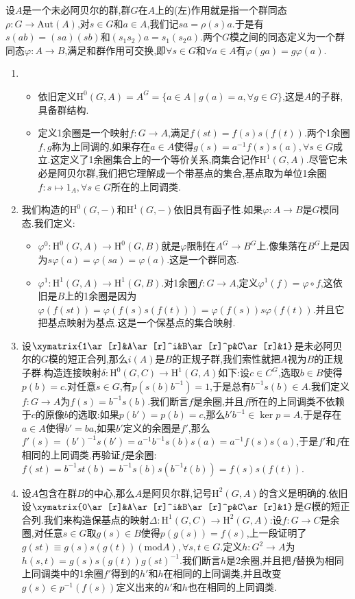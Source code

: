 设$A$是一个未必阿贝尔的群,群$G$在$A$上的(左)作用就是指一个群同态$\rho:G\to\mathrm{Aut}(A)$,对$s\in G$和$a\in A$,我们记$sa=\rho(s)a$.于是有$s(ab)=(sa)(sb)$和$(s_1s_2)a=s_1(s_2a)$.两个$G$模之间的同态定义为一个群同态$\varphi:A\to B$,满足和群作用可交换,即$\forall s\in G$和$\forall a\in A$有$\varphi(ga)=g\varphi(a)$.
\begin{enumerate}
	\item 
	\begin{itemize}
		\item 依旧定义$\mathrm{H}^0(G,A)=A^G=\{a\in A\mid g(a)=a,\forall g\in G\}$,这是$A$的子群,具备群结构.
		\item 定义1余圈是一个映射$f:G\to A$,满足$f(st)=f(s)s(f(t))$.两个1余圈$f,g$称为上同调的,如果存在$a\in A$使得$g(s)=a^{-1}f(s)s(a),\forall s\in G$成立.这定义了1余圈集合上的一个等价关系,商集合记作$\mathrm{H}^1(G,A)$.尽管它未必是阿贝尔群,我们把它理解成一个带基点的集合,基点取为单位1余圈$f:s\mapsto1_A,\forall s\in G$所在的上同调类.
	\end{itemize}
	\item 我们构造的$\mathrm{H}^0(G,-)$和$\mathrm{H}^1(G,-)$依旧具有函子性.如果$\varphi:A\to B$是$G$模同态.我们定义:
	\begin{itemize}
		\item $\varphi^0:\mathrm{H}^0(G,A)\to\mathrm{H}^0(G,B)$就是$\varphi$限制在$A^G\to B^G$上.像集落在$B^G$上是因为$s\varphi(a)=\varphi(sa)=\varphi(a)$.这是一个群同态.
		\item $\varphi^1:\mathrm{H}^1(G,A)\to\mathrm{H}^1(G,B)$.对1余圈$f:G\to A$,定义$\varphi^1(f)=\varphi\circ f$,这依旧是$B$上的1余圈是因为$\varphi(f(st))=\varphi(f(s)s(f(t)))=\varphi(f(s))s\varphi(f(t))$.并且它把基点映射为基点.这是一个保基点的集合映射.
	\end{itemize}
	\item 设$\xymatrix{1\ar[r]&A\ar[r]^i&B\ar[r]^p&C\ar[r]&1}$是未必阿贝尔的$G$模的短正合列,那么$i(A)$是$B$的正规子群,我们索性就把$A$视为$B$的正规子群.构造连接映射$\delta:\mathrm{H}^0(G,C)\to\mathrm{H}^1(G,A)$如下:设$c\in C^G$,选取$b\in B$使得$p(b)=c$.对任意$s\in G$,有$p(s(b)b^{-1})=1$,于是总有$b^{-1}s(b)\in A$.我们定义$f:G\to A$为$f(s)=b^{-1}s(b)$.我们断言$f$是余圈,并且$f$所在的上同调类不依赖于$c$的原像$b$的选取:如果$p(b')=p(b)=c$,那么$b'b^{-1}\in\ker p=A$,于是存在$a\in A$使得$b'=ba$,如果$b'$定义的余圈是$f'$,那么$f'(s)=(b')^{-1}s(b')=a^{-1}b^{-1}s(b)s(a)=a^{-1}f(s)s(a)$,于是$f'$和$f$在相同的上同调类.再验证$f$是余圈:$f(st)=b^{-1}st(b)=b^{-1}s(b)s(b^{-1}t(b))=f(s)s(f(t))$.
	\item 设$A$包含在群$B$的中心,那么$A$是阿贝尔群,记号$\mathrm{H}^2(G,A)$的含义是明确的.依旧设$\xymatrix{0\ar[r]&A\ar[r]^i&B\ar[r]^p&C\ar[r]&1}$是$G$模的短正合列.我们来构造保基点的映射$\Delta:\mathrm{H}^1(G,C)\to\mathrm{H}^2(G,A)$:设$f:G\to C$是余圈,对任意$s\in G$取$g(s)\in B$使得$p(g(s))=f(s)$,上一段证明了$g(st)\equiv g(s)s(g(t))(\mathrm{mod}A),\forall s,t\in G$.定义$h:G^2\to A$为$h(s,t)=g(s)s(g(t))g(st)^{-1}$.我们断言$h$是2余圈,并且把$f$替换为相同上同调类中的1余圈$f'$得到的$h'$和$h$在相同的上同调类,并且改变$g(s)\in p^{-1}(f(s))$定义出来的$h'$和$h$也在相同的上同调类.

\end{enumerate}
